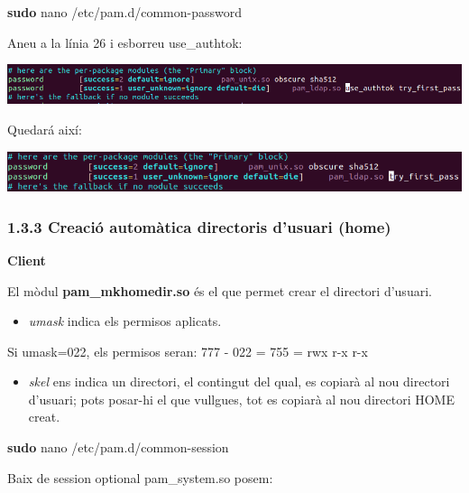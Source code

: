 \documentclass[
  12 pt,
  a4paper,
]{article}
\newenvironment{Shaded}{\begin{snugshade}}{\end{snugshade}}
\newcommand{\FunctionTok}[1]{\textcolor[rgb]{0.13,0.29,0.53}{\textbf{#1}}}
\newcommand{\NormalTok}[1]{#1}
\providecommand{\tightlist}{%
  \setlength{\itemsep}{0pt}\setlength{\parskip}{0pt}}
\begin{document}
\begin{Shaded}
\begin{Highlighting}[]
\FunctionTok{sudo}\NormalTok{ nano /etc/pam.d/common{-}password}
\end{Highlighting}
\end{Shaded}

Aneu a la línia 26 i esborreu use\_authtok:

\includegraphics{png/libpam6.png}

Quedará així:

\includegraphics{png/libpam7.png}

\subsubsection{1.3.3 Creació automàtica directoris d'usuari
(home)}\label{creaciuxf3-automuxe0tica-directoris-dusuari-home}

\textbf{Client}

El mòdul \textbf{pam\_mkhomedir.so} és el que permet crear el directori
d'usuari.

\begin{itemize}
\tightlist
\item
  \emph{umask} indica els permisos aplicats.
\end{itemize}

Si umask=022, els permisos seran: 777 - 022 = 755 = rwx r-x r-x

\begin{itemize}
\tightlist
\item
  \emph{skel} ens indica un directori, el contingut del qual, es copiarà
  al nou directori d'usuari; pots posar-hi el que vullgues, tot es
  copiarà al nou directori HOME creat.
\end{itemize}

\begin{Shaded}
\begin{Highlighting}[]
\FunctionTok{sudo}\NormalTok{ nano /etc/pam.d/common{-}session}
\end{Highlighting}
\end{Shaded}

Baix de session optional pam\_system.so posem:
\end{document}
